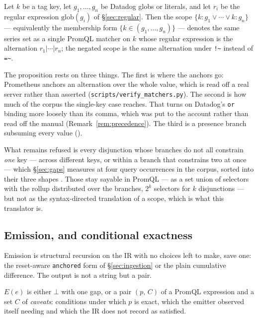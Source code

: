 \begin{proposition}\label{prop:disjunction}
Let $k$ be a tag key, let $g_1,\dots,g_n$ be Datadog globs or literals, and let $r_i$ be
the regular expression $\mathrm{glob}(g_i)$ of \S\ref{sec:regular}. Then the scope
$\{k{:}g_1 \vee \cdots \vee k{:}g_n\}$ --- equivalently the membership form
$\{k \in (g_1,\dots,g_n)\}$ --- denotes the same series set as a single PromQL matcher on
$k$ whose regular expression is the alternation $r_1|\cdots|r_n$; the negated scope is
the same alternation under \texttt{!\textasciitilde{}} instead of
\texttt{=\textasciitilde{}}.
\end{proposition}

The proposition rests on three things. The first is where the anchors go: Prometheus
anchors an alternation over the whole value, which is read off a real server rather than
asserted (\texttt{scripts\slash verify\_matchers.py}). The second is how much of the
corpus the single-key case reaches. That turns on Datadog's \texttt{or} binding more
loosely than its comma, which was put to the account rather than read off the manual
(Remark~\ref{rem:precedence}). The third is a presence branch subsuming every value
().

\iffull\fi

What remains refused is every disjunction whose branches do not all constrain
\emph{one} key --- across different keys, or within a branch that constrains two at
once --- which \S\ref{sec:gaps} measures at four query occurrences in the corpus, sorted into
their three shapes . Those stay sayable in
PromQL --- as a set union of selectors with the rollup distributed over the branches,
$2^k$ selectors for $k$ disjunctions --- but not as the syntax-directed translation of a
scope, which is what this translator is.

\subsection{Emission, and conditional exactness}
\label{sec:emission}

Emission is structural recursion on the IR with no choices left to make, save one: the
reset-aware \texttt{anchored} form of \S\ref{sec:ingestion} or the plain cumulative
difference. The output is not a string but a pair.

\begin{definition}[Emission]\label{def:emission}
$E(e)$ is either $\bot$ with one gap, or a pair $(p,\,C)$ of a PromQL expression and a
set $C$ of \emph{caveats}: conditions under which $p$ is exact, which the emitter
observed itself needing and which the IR does not record as satisfied.
\end{definition}

